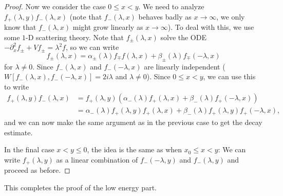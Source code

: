 \begin{proof}
  Now we consider the case $0 \le x < y$. We need
  to analyze $f_+(\lambda, y) f_-(\lambda, x)$ (note
  that $f_-(\lambda, x)$ behaves badly as
  $x \to \infty$, we only know that $f_-(\lambda, x)$
  might grow linearly as $x \to \infty$). To deal
  with this, we use
  some $1$-D scattering theory. Note that
  $f_\pm(\lambda, x)$ solve the ODE
  $-\partial_x^2 f_\pm + V f_\pm = \lambda^2 f$,
  so we can write
  \[
    f_\pm(\lambda, x) = \alpha_{\pm}(\lambda) f_{\mp} f(\lambda, x)
    + \beta_{\pm}(\lambda) f_{\mp}(-\lambda, x)
  \]
  for $\lambda \ne 0$. Since
  $f_-(\lambda, x)$ and $f_-(-\lambda, x)$ are
  linearly independent ($W[f_-(\lambda, x), f_-(-\lambda, x)] = 2i\lambda$ and $\lambda \ne 0$).
  Since $0 \le x < y$, we can use this to write
  \begin{align*}
    f_+(\lambda, y) f_-(\lambda, x)
    &= f_+(\lambda, y)(\alpha_-(\lambda) f_+(\lambda, x) + \beta_-(\lambda) f_+(-\lambda, x)) \\
    &= \alpha_-(\lambda) f_+(\lambda, y) f_+(\lambda, x)
    + \beta_-(\lambda) f_+(\lambda, y) f_+(-\lambda, x),
  \end{align*}
  and we can now make the same argument as in the
  previous case to get the decay estimate.

  In the final case $x < y \le 0$, the idea is the same
  as when $x_0 \le x < y$:
  We can write $f_+(\lambda, y)$ as a linear combination of
  $f_-(-\lambda, y)$ and $f_-(\lambda, y)$ and
  proceed as before.
\end{proof}

\begin{remark}
  This completes the proof of the low energy part.
\end{remark}

